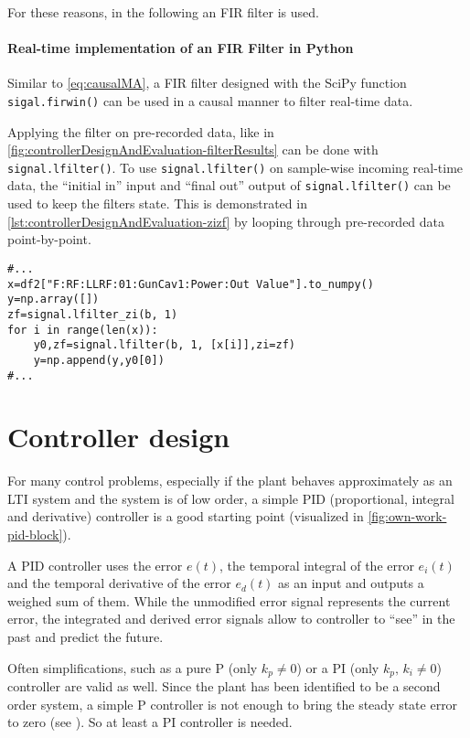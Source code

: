 For these reasons, in the following an FIR filter is used.

\paragraph{Real-time implementation of an FIR Filter in Python}
Similar to \autoref{eq:causalMA}, a FIR filter designed with the SciPy function \texttt{sigal.firwin()} can be used in a causal manner to filter real-time data.

Applying the filter on pre-recorded data, like in \autoref{fig:controllerDesignAndEvaluation-filterResults} can be done with \texttt{signal.lfilter()}. To use \texttt{signal.lfilter()} on sample-wise incoming real-time data, the ``initial in'' input and ``final out'' output of \texttt{signal.lfilter()} can be used to keep the filters state. This is demonstrated in \autoref{lst:controllerDesignAndEvaluation-zizf} by looping through pre-recorded data point-by-point.

\begin{lstlisting}[style=python,caption = Demonstration of the \texttt{zi} and \texttt{zf} variables when using \texttt{signal.lfilter()}, label = lst:controllerDesignAndEvaluation-zizf]
#...
x=df2["F:RF:LLRF:01:GunCav1:Power:Out Value"].to_numpy()
y=np.array([])
zf=signal.lfilter_zi(b, 1)
for i in range(len(x)):
    y0,zf=signal.lfilter(b, 1, [x[i]],zi=zf)
    y=np.append(y,y0[0])
#...
\end{lstlisting}



\section{Controller design}
For many control problems, especially if the plant behaves approximately as an LTI system and the system is of low order, a simple PID (proportional, integral and derivative) controller is a good starting point (visualized in \autoref{fig:own-work-pid-block}). 

A PID controller uses the error $e(t)$, the temporal integral of the error $e_i(t)$ and the temporal derivative of the error $e_d(t)$ as an input and outputs a weighed sum of them. While the unmodified error signal represents the current error, the integrated and derived error signals allow to controller to ``see'' in the past and predict the future.

Often simplifications, such as a pure P (only $k_p \neq 0$) or a PI (only $k_p,\,k_i \neq 0$) controller are valid as well. Since the plant has been identified to be a second order system, a simple P controller is not enough to bring the steady state error to zero (see ). So at least a PI controller is needed.

